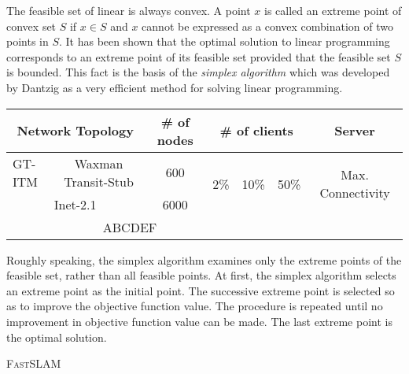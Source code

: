 The feasible set of linear is always convex. A point $x$ is called an extreme
point of convex set $S$ if $x\in S$ and $x$ cannot be expressed as a convex
combination of two points in $S$. It has been shown that the optimal solution to
linear programming corresponds to an extreme point of its feasible set provided
that the feasible set $S$ is bounded. This fact is the basis of the {\em simplex
		algorithm} which was developed by Dantzig as a very efficient method for
solving linear programming.
\begin{table}[ht]
	\centering
	\label{tab:badtabular2}
	\wuhao
	\begin{tabular}[c]{|m{1.5cm}|c|c|c|c|c|c|}\hline
		\multicolumn{2}{|c|}{Network Topology} & \# of nodes                 &
		\multicolumn{3}{c|}{\# of clients}     & Server                                                       \\\hline
		GT-ITM                                 & Waxman Transit-Stub         & 600                   &
		\multirow{2}{2em}{2\%}                 &
		\multirow{2}{2em}{10\%}                &
		\multirow{2}{2em}{50\%}                &
		\multirow{2}{1.2in}{Max. Connectivity}                                                                \\\cline{1-3}
		\multicolumn{2}{|c|}{Inet-2.1}         & 6000                        &                       &   &  & \\\hline
		                                       & \multicolumn{2}{c|}{ABCDEF} & \multicolumn{4}{c|}{}          \\\hline
	\end{tabular}
\end{table}

Roughly speaking, the simplex algorithm examines only the extreme points of the
feasible set, rather than all feasible points. At first, the simplex algorithm
selects an extreme point as the initial point. The successive extreme point is
selected so as to improve the objective function value. The procedure is
repeated until no improvement in objective function value can be made. The last
extreme point is the optimal solution.

\begin{algorithmen}
	\wuhao
	\DontPrintSemicolon
	\caption{\textsc{Fast}SLAM}
\end{algorithmen}

